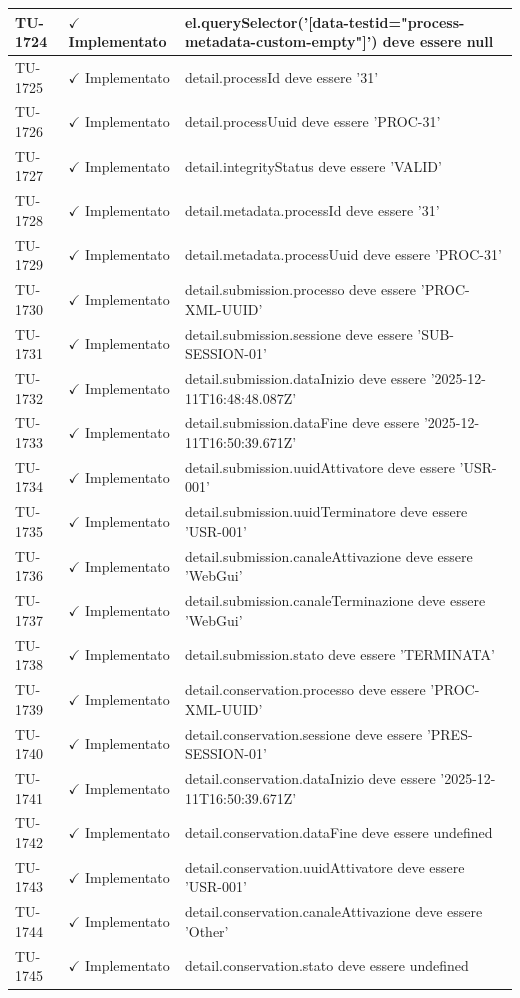 ﻿\documentclass[a4paper,12pt]{article}
\newcommand{\ok}{\textcolor{green!60!black}{$\checkmark$ Implementato}}
\begin{document}
\begin{longtable}{|p{2cm}|p{3.5cm}|p{9.5cm}|}
\hline
TU-1724 & \ok & el.querySelector('[data-testid="process-metadata-custom-empty"]') deve essere null \\
\hline
TU-1725 & \ok & detail.processId deve essere '31' \\
\hline
TU-1726 & \ok & detail.processUuid deve essere 'PROC-31' \\
\hline
TU-1727 & \ok & detail.integrityStatus deve essere 'VALID' \\
\hline
TU-1728 & \ok & detail.metadata.processId deve essere '31' \\
\hline
TU-1729 & \ok & detail.metadata.processUuid deve essere 'PROC-31' \\
\hline
TU-1730 & \ok & detail.submission.processo deve essere 'PROC-XML-UUID' \\
\hline
TU-1731 & \ok & detail.submission.sessione deve essere 'SUB-SESSION-01' \\
\hline
TU-1732 & \ok & detail.submission.dataInizio deve essere '2025-12-11T16:48:48.087Z' \\
\hline
TU-1733 & \ok & detail.submission.dataFine deve essere '2025-12-11T16:50:39.671Z' \\
\hline
TU-1734 & \ok & detail.submission.uuidAttivatore deve essere 'USR-001' \\
\hline
TU-1735 & \ok & detail.submission.uuidTerminatore deve essere 'USR-001' \\
\hline
TU-1736 & \ok & detail.submission.canaleAttivazione deve essere 'WebGui' \\
\hline
TU-1737 & \ok & detail.submission.canaleTerminazione deve essere 'WebGui' \\
\hline
TU-1738 & \ok & detail.submission.stato deve essere 'TERMINATA' \\
\hline
TU-1739 & \ok & detail.conservation.processo deve essere 'PROC-XML-UUID' \\
\hline
TU-1740 & \ok & detail.conservation.sessione deve essere 'PRES-SESSION-01' \\
\hline
TU-1741 & \ok & detail.conservation.dataInizio deve essere '2025-12-11T16:50:39.671Z' \\
\hline
TU-1742 & \ok & detail.conservation.dataFine deve essere undefined \\
\hline
TU-1743 & \ok & detail.conservation.uuidAttivatore deve essere 'USR-001' \\
\hline
TU-1744 & \ok & detail.conservation.canaleAttivazione deve essere 'Other' \\
\hline
TU-1745 & \ok & detail.conservation.stato deve essere undefined \\

\end{longtable}
\end{document}

